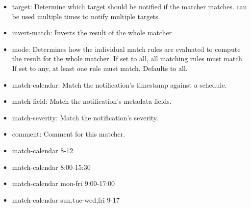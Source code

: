 \begin{itemize}[leftmargin=2cm]

	\item target: Determine which target should be notified if the matcher matches. can be used multiple times to notify multiple targets.

	\item invert-match: Inverts the result of the whole matcher

	\item mode: Determines how the individual match rules are evaluated to compute the result for the whole matcher. If set to all, all matching rules must match. If set to any, at least one rule must match. Defaults to all.

	\item match-calendar: Match the notification’s timestamp against a schedule.

	\item match-field: Match the notification’s metadata fields.

	\item match-severity: Match the notification’s severity.

	\item comment: Comment for this matcher.

\end{itemize}

\begin{itemize}[leftmargin=2cm]

	\item match-calendar 8-12

	\item match-calendar 8:00-15:30

	\item match-calendar mon-fri 9:00-17:00

	\item match-calendar sun,tue-wed,fri 9-17

\end{itemize}


